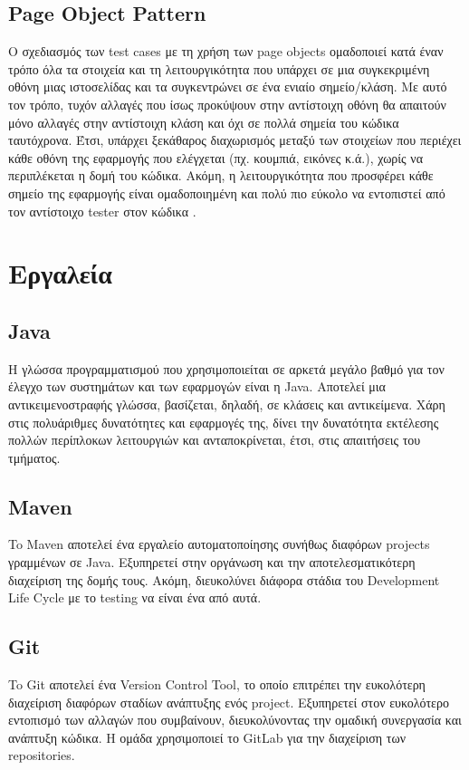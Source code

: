 \subsection*{Page Object Pattern}
Ο σχεδιασμός των test cases με τη χρήση των page objects ομαδοποιεί κατά έναν τρόπο όλα τα στοιχεία και τη λειτουργικότητα που υπάρχει σε μια 
συγκεκριμένη οθόνη μιας ιστοσελίδας και τα συγκεντρώνει σε ένα ενιαίο σημείο/κλάση. Με αυτό τον τρόπο, τυχόν αλλαγές που ίσως προκύψουν στην αντίστοιχη 
οθόνη θα απαιτούν μόνο αλλαγές στην αντίστοιχη κλάση και όχι σε πολλά σημεία του κώδικα ταυτόχρονα. Έτσι, υπάρχει ξεκάθαρος διαχωρισμός μεταξύ των στοιχείων 
που περιέχει κάθε οθόνη της εφαρμογής που ελέγχεται (πχ. κουμπιά, εικόνες κ.ά.), χωρίς να περιπλέκεται η δομή του κώδικα. Ακόμη, η λειτουργικότητα 
που προσφέρει κάθε σημείο της εφαρμογής είναι ομαδοποιημένη και πολύ πιο εύκολο να εντοπιστεί από τον αντίστοιχο tester στον κώδικα \cite{pageobject}.

\section*{Εργαλεία}
\subsection*{Java}
Η γλώσσα προγραμματισμού που χρησιμοποιείται σε αρκετά μεγάλο βαθμό για τον έλεγχο των συστημάτων και των εφαρμογών είναι η Java. Αποτελεί μια 
αντικειμενοστραφής γλώσσα, βασίζεται, δηλαδή, σε κλάσεις και αντικείμενα. Χάρη στις πολυάριθμες δυνατότητες και εφαρμογές της, δίνει την 
δυνατότητα εκτέλεσης πολλών περίπλοκων λειτουργιών και ανταποκρίνεται, έτσι, στις απαιτήσεις του τμήματος.
\subsection*{Maven}
To Maven αποτελεί ένα εργαλείο αυτοματοποίησης συνήθως διαφόρων projects γραμμένων σε Java. Εξυπηρετεί στην οργάνωση και την αποτελεσματικότερη 
διαχείριση της δομής τους. Ακόμη, διευκολύνει διάφορα στάδια του Development Life Cycle με το testing να είναι ένα από αυτά.
\subsection*{Git}
To Git αποτελεί ένα Version Control Tool, το οποίο επιτρέπει την ευκολότερη διαχείριση διαφόρων σταδίων ανάπτυξης ενός project. Εξυπηρετεί 
στον ευκολότερο εντοπισμό των αλλαγών που συμβαίνουν, διευκολύνοντας την ομαδική συνεργασία και ανάπτυξη κώδικα. Η ομάδα χρησιμοποιεί το GitLab 
για την διαχείριση των repositories.
